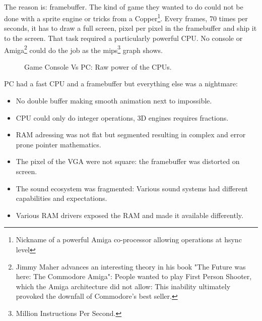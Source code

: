\\
The reason is: framebuffer. The kind of game they wanted to do could not be done with a sprite engine or tricks from a Copper\footnote{Nickname of a powerful Amiga co-processor allowing operations at hsync level}. Every frames, 70 times per seconds, it has to draw a full screen, pixel per pixel in the framebuffer and ship it to the screen. That task required a particularly powerful CPU. No console or Amiga\footnote{Jimmy Maher advances an interesting theory in his book "The Future was here: The Commodore Amiga": People wanted to play First Person Shooter, which the Amiga architecture did not allow: This inability ultimately provoked the downfall of Commodore's best seller.} could do the job as the mips\footnote{Million Instructions Per Second.} graph shows.
\par
\begin{figure}[H]
\centering
   \caption{Game Console Vs PC: Raw power of the CPUs.} \label{fig:game_console_vs_PC}
 \end{figure}
 
PC had a fast CPU and a framebuffer but everything else was a nightmare:
\begin{itemize}
\item No double buffer making smooth animation next to impossible.
\item CPU could only do integer operations, 3D engines requires fractions.
\item RAM adressing was not flat but segmented resulting in complex and error prone pointer mathematics.
\item The pixel of the VGA were not square: the framebuffer was distorted on screen.
\item The sound ecosystem was fragmented: Various sound systems had different capabilities and expectations.
\item Various RAM drivers exposed the RAM and made it available differently.
\end{itemize}

